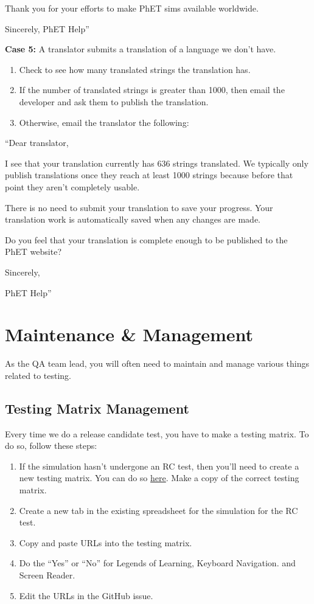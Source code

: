 \documentclass[titlepage]{article}
\begin{document}
Thank you for your efforts to make PhET sims available worldwide.

Sincerely,
PhET Help''

\textbf{Case 5:}
A translator submits a translation of a language we don't have.

		\begin{enumerate}
			\item Check to see how many translated strings the translation has.
			\item If the number of translated strings is greater than 1000, then email the developer and ask them to publish the translation.
			\item Otherwise, email the translator the following:
		\end{enumerate}

``Dear translator,

I see that your translation currently has 636 strings translated. We typically only publish translations once they reach at least 1000 strings because before that point they aren't completely usable.

There is no need to submit your translation to save your progress. Your translation work is automatically saved when any changes are made.

Do you feel that your translation is complete enough to be published to the PhET website?

Sincerely,

PhET Help''

\pagebreak


\section{Maintenance \& Management}

As the QA team lead, you will often need to maintain and manage various things related to testing.

	\subsection{Testing Matrix Management}\label{subsec:matrix}

Every time we do a release candidate test, you have to make a testing matrix. To do so, follow these steps:

		\begin{enumerate}
			\item If the simulation hasn't undergone an RC test, then you'll need to create a new testing matrix. You can do so \href{https://drive.google.com/drive/folders/0B6CMwxdP0NGYbW9fTGNCODdYVjQ}{here}. Make a copy of the correct testing matrix.
			\item Create a new tab in the existing spreadsheet for the simulation for the RC test.
			\item Copy and paste URLs into the testing matrix.
			\item Do the ``Yes'' or ``No'' for Legends of Learning, Keyboard Navigation. and Screen Reader.
			\item Edit the URLs in the GitHub issue.
		\end{enumerate}
\end{document}

